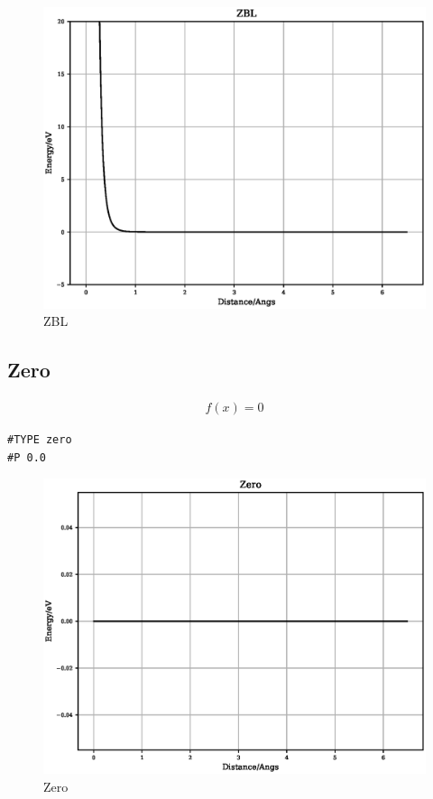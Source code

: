 \FloatBarrier
\begin{figure}[h]
  \begin{center}
    \includegraphics[scale=0.5]{appendix/functions/plots/zbl.eps}
    \caption{ZBL}
    \label{graph:graph1}
  \end{center}
\end{figure}
\FloatBarrier







\subsection{Zero}

\begin{equation}
\begin{split}
f(x) = 0
\end{split}
\label{eq:zero}
\end{equation}

\begin{lstlisting}[style=pseudocode,caption={Zero}]
#TYPE zero
#P 0.0
\end{lstlisting}

\FloatBarrier
\begin{figure}[h]
  \begin{center}
    \includegraphics[scale=0.5]{appendix/functions/plots/zero.eps}
    \caption{Zero}
    \label{graph:graph1}
  \end{center}
\end{figure}
\FloatBarrier


